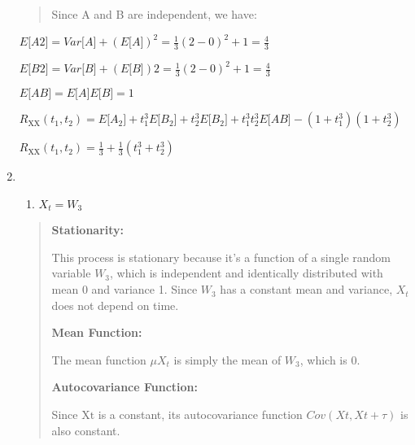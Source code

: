 \documentclass{article}
\begin{document}
\begin{enumerate}
    \begin{quote}
    Since A and B are independent, we have:
    \end{quote}

    $E\lbrack A2\rbrack = Var\lbrack A\rbrack + \left( E\lbrack A\rbrack \right)^{2} = \frac{1}{3}(2 - 0)^{2} + 1 = \frac{4}{3}$

    $E\lbrack B2\rbrack = Var\lbrack B\rbrack + (E\lbrack B\rbrack)2 = \frac{1}{3}(2 - 0)^{2} + 1 = \frac{4}{3}$

    $E\lbrack AB\rbrack = E\lbrack A\rbrack E\lbrack B\rbrack = 1$

    $R_{\text{XX}}(t_{1},t_{2}) = E\lbrack A_{2}\rbrack + t_{1}^{3} E\lbrack B_{2}\rbrack + t_{2}^{3} E\lbrack B_{2}\rbrack + t_{1}^{3} t_{2}^{3} E\lbrack AB\rbrack - (1 + t_{1}^{3})(1 + t_{2}^{3})$

    $R_{\text{XX}}\left( t_{1},t_{2} \right) = \frac{1}{3} + \frac{1}{3}\left( t_{1}^{3} + t_{2}^{3} \right)$

\newpage
\item

    \begin{enumerate}
    \def\labelenumi{\alph{enumi}.}
    \item
    \(X_{t} = W_{3}\)
    \end{enumerate}

    \begin{quote}
    \textbf{Stationarity:}

    This process is stationary because it's a function of a single random
    variable \(W_{3}\)\hspace{0pt}, which is independent and identically
    distributed with mean 0 and variance 1. Since \(W_{3}\)\hspace{0pt} has
    a constant mean and variance, \(X_{t}\)\hspace{0pt} does not depend on
    time.

    \textbf{Mean Function:}

    The mean function \(\mu X_{t}\)\hspace{0pt}\hspace{0pt} is simply the
    mean of \(W_{3}\)\hspace{0pt}, which is 0.

    \textbf{Autocovariance Function:}

    Since \(\text{Xt}\)\hspace{0pt} is a constant, its autocovariance
    function \(Cov(Xt,Xt + \tau)\) is also constant.
    \end{quote}


\end{enumerate}
\end{document}
